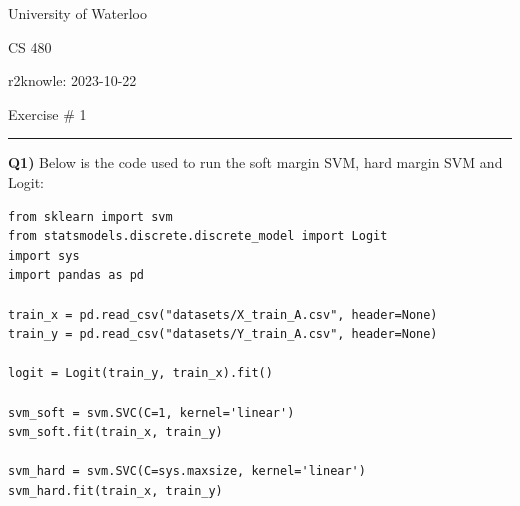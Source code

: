 \documentclass{article}
\begin{document}
\begin{titlepage}
	\setlength{\parindent}{0pt}
	\large

\vspace*{-2cm}



University of Waterloo \par
CS 480 \par
\vspace{0.05cm}
r2knowle: 2023-10-22
\vspace{0.2cm}

{\huge Exercise \# 1 \par}
\hrule

\vspace{0.5cm}
\textbf{Q1)} Below is the code used to run the soft margin SVM, hard margin SVM and Logit:
\begin{lstlisting}
from sklearn import svm
from statsmodels.discrete.discrete_model import Logit
import sys
import pandas as pd

train_x = pd.read_csv("datasets/X_train_A.csv", header=None)
train_y = pd.read_csv("datasets/Y_train_A.csv", header=None)

logit = Logit(train_y, train_x).fit()

svm_soft = svm.SVC(C=1, kernel='linear')
svm_soft.fit(train_x, train_y)

svm_hard = svm.SVC(C=sys.maxsize, kernel='linear')
svm_hard.fit(train_x, train_y)



\end{lstlisting}
\end{titlepage}
\end{document}
